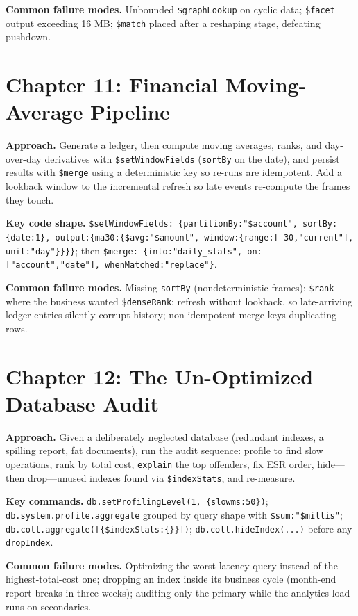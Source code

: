 \textbf{Common failure modes.} Unbounded \texttt{\$graphLookup} on cyclic data; \texttt{\$facet}
output exceeding 16 MB; \texttt{\$match} placed after a reshaping stage, defeating pushdown.

\section{Chapter 11: Financial Moving-Average Pipeline}
\textbf{Approach.} Generate a ledger, then compute moving averages, ranks, and day-over-day
derivatives with \texttt{\$setWindowFields} (\texttt{sortBy} on the date), and persist results
with \texttt{\$merge} using a deterministic key so re-runs are idempotent. Add a lookback window
to the incremental refresh so late events re-compute the frames they touch.

\textbf{Key code shape.} \texttt{\$setWindowFields: \{partitionBy:"\$account", sortBy:\{date:1\},
output:\{ma30:\{\$avg:"\$amount", window:\{range:[-30,"current"], unit:"day"\}\}\}\}}; then
\texttt{\$merge: \{into:"daily\_stats", on:["account","date"], whenMatched:"replace"\}}.

\textbf{Common failure modes.} Missing \texttt{sortBy} (nondeterministic frames);
\texttt{\$rank} where the business wanted \texttt{\$denseRank}; refresh without lookback, so
late-arriving ledger entries silently corrupt history; non-idempotent merge keys duplicating rows.

\section{Chapter 12: The Un-Optimized Database Audit}
\textbf{Approach.} Given a deliberately neglected database (redundant indexes, a spilling
report, fat documents), run the audit sequence: profile to find slow operations, rank by total
cost, \texttt{explain} the top offenders, fix ESR order, hide---then drop---unused indexes found
via \texttt{\$indexStats}, and re-measure.

\textbf{Key commands.} \texttt{db.setProfilingLevel(1, \{slowms:50\})};
\texttt{db.system.profile.aggregate} grouped by query shape with \texttt{\$sum:"\$millis"};
\texttt{db.coll.aggregate([\{\$indexStats:\{\}\}])}; \texttt{db.coll.hideIndex(...)} before any
\texttt{dropIndex}.

\textbf{Common failure modes.} Optimizing the worst-latency query instead of the
highest-total-cost one; dropping an index inside its business cycle (month-end report breaks in
three weeks); auditing only the primary while the analytics load runs on secondaries.

